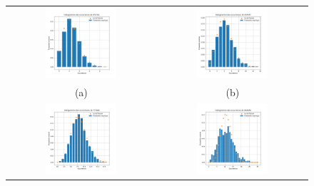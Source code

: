 \documentclass[a4paper,12pt]{article}
\begin{document}
\begin{figure}
\centering
\begin{tabular}{@{} c @{} c @{}}
\includegraphics[width=0.5\textwidth]{Figures/histogramme_Markov_Poisson_ATCTGC.png} & \includegraphics[width=0.5\textwidth]{Figures/histogramme_Markov_Poisson_ATATAT.png} \tabularnewline
(a) & (b) \tabularnewline
\includegraphics[width=0.5\textwidth]{Figures/histogramme_Markov_Poisson_TTTAAA.png} & \includegraphics[width=0.5\textwidth]{Figures/histogramme_Markov_Poisson_AAAAAA.png} \tabularnewline

\end{tabular}
\end{figure}
\end{document}
